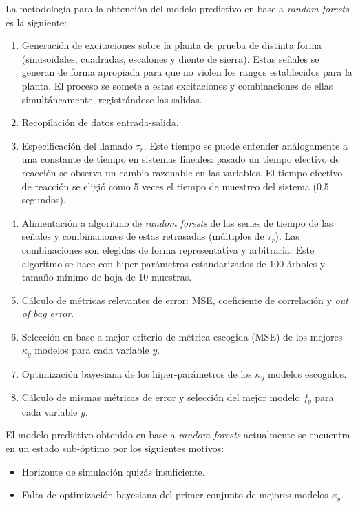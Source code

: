 \documentclass{article}
\begin{document}
La metodología para la obtención del modelo predictivo en base a \textit{random forests} es la siguiente:
\begin{enumerate}
\item Generación de excitaciones sobre la planta de prueba de distinta forma (sinusoidales, cuadradas, escalones y diente de sierra). Estas señales se generan de forma apropiada para que no violen los rangos establecidos para la planta. El proceso se somete a estas excitaciones y combinaciones de ellas simultáneamente, registrándose las salidas.
\item Recopilación de datos entrada-salida.
\item Especificación del llamado  $\tau_r$. Este tiempo se puede entender análogamente a una constante de tiempo en sistemas lineales: pasado un tiempo efectivo de reacción se observa un cambio razonable en las variables. El tiempo efectivo de reacción se eligió como 5 veces el tiempo de muestreo del sistema (0.5 segundos).
\item Alimentación a algoritmo de \textit{random forests} de las series de tiempo de las señales y combinaciones de estas retrasadas (múltiplos de $\tau_r$). Las combinaciones son elegidas de forma representativa y arbitraria. Este algoritmo se hace con hiper-parámetros estandarizados de 100 árboles y tamaño mínimo de hoja de 10 muestras.
\item Cálculo de métricas relevantes de error: MSE, coeficiente de correlación y \textit{out of bag error}.
\item Selección en base a mejor criterio de métrica escogida (MSE) de los mejores $\kappa_y$ modelos para cada variable $y$.
\item Optimización bayesiana de los hiper-parámetros de los $\kappa_y$ modelos escogidos.
\item Cálculo de mismas métricas de error y selección del mejor modelo $f_y$ para cada variable $y$.
\end{enumerate}

El modelo predictivo obtenido en base a \textit{random forests} actualmente se encuentra en un estado sub-óptimo por los siguientes motivos:
\begin{itemize}
\item Horizonte de simulación quizás insuficiente.
\item Falta de optimización bayesiana del primer conjunto de mejores modelos $\kappa_y$.
\end{itemize}
\end{document}
